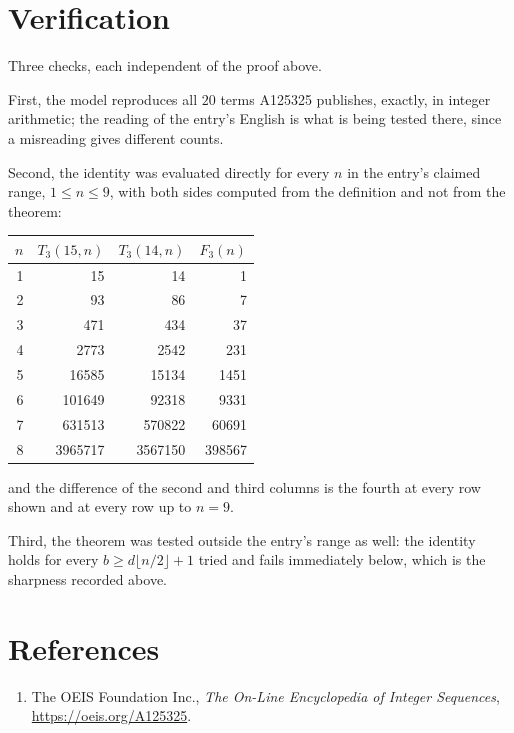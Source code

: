 \documentclass[11pt,a4paper]{article}
\theoremstyle{plain}
\theoremstyle{definition}
\begin{document}
\section{Verification}

Three checks, each independent of the proof above.

First, the model reproduces all $20$ terms A125325 publishes, exactly, in integer
arithmetic; the reading of the entry's English is what is being tested there, since a
misreading gives different counts.

Second, the identity was evaluated directly for every $n$ in the entry's claimed range,
$1\le n\le9$, with both sides computed from the definition and not from the theorem:

\begin{center}
\begin{tabular}{rrrr}
$n$ & $T_{3}(15,n)$ & $T_{3}(14,n)$ & $F_{3}(n)$ \\ \hline
1 & 15 & 14 & 1 \\
2 & 93 & 86 & 7 \\
3 & 471 & 434 & 37 \\
4 & 2773 & 2542 & 231 \\
5 & 16585 & 15134 & 1451 \\
6 & 101649 & 92318 & 9331 \\
7 & 631513 & 570822 & 60691 \\
8 & 3965717 & 3567150 & 398567 \\
\end{tabular}
\end{center}

\noindent and the difference of the second and third columns is the fourth at every row shown
and at every row up to $n=9$.

Third, the theorem was tested outside the entry's range as well: the identity holds for every
$b\ge d\lfloor n/2\rfloor+1$ tried and fails immediately below, which is the sharpness recorded
above.

\section*{References}
\begin{enumerate}
\item The OEIS Foundation Inc., \emph{The On-Line Encyclopedia of Integer Sequences},
\url{https://oeis.org/A125325}.
\end{enumerate}
\end{document}
